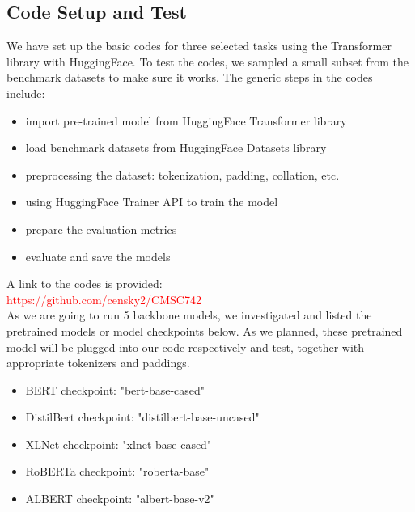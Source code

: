 \documentclass{article}
\begin{document}
\subsection{Code Setup and Test}
We have set up the basic codes for three selected tasks using the Transformer library with HuggingFace. To test the codes, we sampled a small subset from the benchmark datasets to make sure it works. The generic steps in the codes include:
\begin{itemize}
    \item import pre-trained model from HuggingFace Transformer library
    \item load benchmark datasets from HuggingFace Datasets library
    \item preprocessing the dataset: tokenization, padding, collation, etc.
    \item using HuggingFace Trainer API to train the model
    \item prepare the evaluation metrics
    \item evaluate and save the models
\end{itemize} A link to the codes is provided: \\
\textcolor{red}{https://github.com/censky2/CMSC742 }\\

As we are going to run 5 backbone models, we investigated and listed the pretrained models or model checkpoints below. As we planned, these pretrained model will be plugged into our code respectively and test, together with appropriate tokenizers and paddings.

\begin{itemize}
    \item BERT checkpoint: "bert-base-cased"
    \item DistilBert checkpoint: "distilbert-base-uncased"
    \item XLNet checkpoint: "xlnet-base-cased"
    \item RoBERTa checkpoint: "roberta-base"
    \item ALBERT checkpoint: "albert-base-v2"
\end{itemize}
\end{document}
